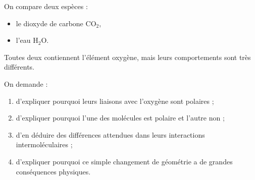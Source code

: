\documentclass[11pt,a4paper]{article}
\begin{document}
\begin{enoncebox}
On compare deux espèces :
\begin{itemize}
    \item le dioxyde de carbone \(\mathrm{CO_2}\),
    \item l'eau \(\mathrm{H_2O}\).
\end{itemize}

Toutes deux contiennent l'élément oxygène, mais leurs comportements sont très différents.

On demande :
\begin{enumerate}[label=\arabic*)]
    \item d'expliquer pourquoi leurs liaisons avec l'oxygène sont polaires ;
    \item d'expliquer pourquoi l'une des molécules est polaire et l'autre non ;
    \item d'en déduire des différences attendues dans leurs interactions intermoléculaires ;
    \item d'expliquer pourquoi ce simple changement de géométrie a de grandes conséquences physiques.
\end{enumerate}
\end{enoncebox}
\end{document}
